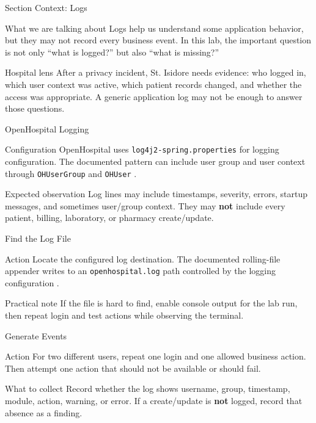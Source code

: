 \documentclass[presentation]{beamer}
\begin{document}
\begin{frame}[c]{Section Context: Logs}
\begin{block}{What we are talking about}
Logs help us understand some application behavior, but they may not record every business event.
In this lab, the important question is not only ``what is logged?'' but also ``what is missing?''
\end{block}

\begin{exampleblock}{Hospital lens}
After a privacy incident, St. Isidore needs evidence: who logged in, which user context was active,
which patient records changed, and whether the access was appropriate. A generic application log may
not be enough to answer those questions.
\end{exampleblock}
\end{frame}

\begin{frame}[c]{OpenHospital Logging}
\begin{block}{Configuration}
OpenHospital uses \texttt{log4j2-spring.properties} for logging configuration. The documented
pattern can include user group and user context through \texttt{OHUserGroup} and \texttt{OHUser}
\cite{openhospital_admin}.
\end{block}

\begin{exampleblock}{Expected observation}
Log lines may include timestamps, severity, errors, startup messages, and sometimes user/group
context. They may \textbf{not} include every patient, billing, laboratory, or pharmacy create/update.
\end{exampleblock}
\end{frame}

\begin{frame}[c]{Find the Log File}
\begin{block}{Action}
Locate the configured log destination. The documented rolling-file appender writes to an
\texttt{openhospital.log} path controlled by the logging configuration \cite{openhospital_admin}.
\end{block}

\begin{exampleblock}{Practical note}
If the file is hard to find, enable console output for the lab run, then repeat login and test
actions while observing the terminal.
\end{exampleblock}
\end{frame}

\begin{frame}[c]{Generate Events}
\begin{block}{Action}
For two different users, repeat one login and one allowed business action. Then attempt one action
that should not be available or should fail.
\end{block}

\begin{exampleblock}{What to collect}
Record whether the log shows username, group, timestamp, module, action, warning, or error. If a
create/update is \textbf{not} logged, record that absence as a finding.
\end{exampleblock}
\end{frame}
\end{document}
